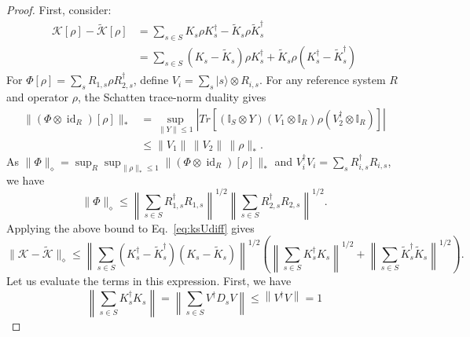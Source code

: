 \documentclass[aps,floatfix,10pt,amssymb,amsfont,amsmath,superscriptaddress,float,nofootinbib,longbibliography,nobalancelastpage,twocolumn]{revtex4-2}
\begin{document}
\begin{proof}
First, consider:
\begin{align}
    \mathcal{K}[\rho] - \tilde{\mathcal{K}}[\rho] &= \sum_{s \in S} K_s\rho K_s^{\dagger} - \tilde K_s\rho \tilde K_s^{\dagger} \\
    &= \sum_{s \in S} (K_s-\tilde K_s)\rho K_s^{\dagger} +\tilde K_s\rho (K_s^{\dagger}- \tilde K_s^{\dagger}) \label{eq:ksUdiff}
\end{align}
For $\Phi[\rho]=\sum_sR_{1,s}\rho R_{2,s}^\dagger$, define
$V_i=\sum_s|s\rangle\otimes R_{i,s}$. For any reference system \(R\)
and operator $\rho$, the Schatten trace-norm duality gives
\begin{align}
\|(\Phi\otimes\operatorname{id}_R)[\rho]\|_*
&=\sup_{\|Y\|\leq1}
\left|Tr\!\left[
(\mathbb I_S\otimes Y)
(V_1\otimes\mathbb I_R) \rho(V_2^\dagger\otimes\mathbb I_R)
\right]\right|\\
&\leq \|V_1\|\,\|V_2\|\,\|\rho\|_*.
\end{align}
As $\|\Phi\|_{\diamond} = \sup_R\sup_{\|\rho\|_*\leq 1}\|(\Phi\otimes\operatorname{id}_R)[\rho]\|_*$ and
\(V_i^\dagger V_i=\sum_sR_{i,s}^\dagger R_{i,s}\), we have
\begin{equation}
\|\Phi\|_\diamond
\leq
\left\|\sum_{s\in S}R_{1,s}^\dagger R_{1,s}\right\|^{1/2}
\left\|\sum_{s\in S}R_{2,s}^\dagger R_{2,s}\right\|^{1/2}.
\end{equation}
Applying the above bound to Eq.~\eqref{eq:ksUdiff}
gives
\begin{equation}
\|\mathcal{K}-\tilde{\mathcal{K}}\|_\diamond
\leq
\left\|\sum_{s\in S}(K_s^\dagger - \tilde K_s^\dagger)(K_s - \tilde K_s)\right\|^{1/2}
\left(
\left\|\sum_{s\in S}K_s^\dagger K_s\right\|^{1/2}
+
\left\|\sum_{s\in S}\tilde K_s^\dagger\tilde K_s\right\|^{1/2}
\right).
\label{eq:row-column-bound}
\end{equation}
Let us evaluate the terms in this expression. First, we have
\begin{equation}
     \left\|\sum_{s\in S} K_s^{\dagger}  K_s \right\| = \left\|\sum_{s\in S}  V^{\dagger}D_sV \right\| \leq  \left\|V^{\dagger} V\right\| = 1
\end{equation}


\end{proof}
\end{document}
